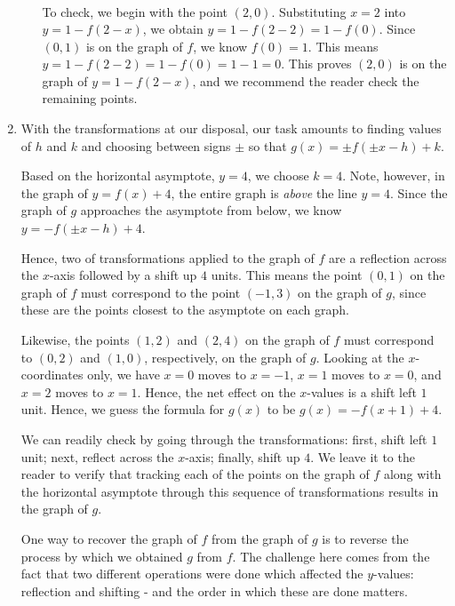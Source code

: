 \documentclass{ximera}
\begin{document}
\begin{example}
\begin{enumerate}
\begin{enumerate}
\[\begin{array}{ccc}
\end{array}\]

To check, we begin with the point $(2,0)$.  Substituting $x=2$ into $y=1 - f(2-x)$, we obtain $y = 1-f(2-2) = 1-f(0)$.  Since $(0,1)$ is on the graph of $f$, we know $f(0) = 1$.  This means $y = 1-f(2-2) = 1-f(0)= 1-1 = 0$.  This proves $(2,0)$ is on the graph of  $y=1 - f(2-x)$, and we recommend the reader check the remaining points.
 
 \end{enumerate}

 \item With the transformations at our disposal,  our task amounts to finding values of $h$ and $k$ and choosing between signs $\pm$  so that  $g(x) = \pm f( \pm x - h) + k$.  
 
 \smallskip
 
 Based on the horizontal asymptote, $y=4$, we choose $k=4$.  Note, however, in the graph of $y=f(x)+4$, the entire graph is \textit{above} the line $y=4$.  Since the graph of $g$ approaches the asymptote from below, we know  $y=-f(\pm x-h)+4$.  
 
 \smallskip
 
 Hence, two of transformations applied to the graph of $f$ are a reflection across the $x$-axis followed by a shift up $4$ units.  This means the point $(0,1)$ on the graph of $f$ must correspond to the point $(-1,3)$ on the graph of $g$, since these are the points closest to the asymptote on each graph.  
  
  \smallskip
  
Likewise, the points $(1,2)$ and $(2,4)$ on the graph of $f$ must correspond to $(0,2)$ and $(1,0)$, respectively, on the graph of $g$.  Looking at the $x$-coordinates only, we have $x=0$ moves to $x=-1$, $x=1$ moves to $x=0$, and $x=2$ moves to $x=1$.  Hence, the net effect on the $x$-values is a shift left $1$ unit.  Hence, we guess the formula for $g(x)$ to be $g(x) = -f(x+1)+4$.  

\smallskip

We can readily check by going through the transformations:  first, shift left $1$ unit; next,  reflect across the $x$-axis;  finally, shift up $4$.  We leave it to the reader to verify that tracking each of the points on the graph of $f$ along with the horizontal asymptote through this sequence of transformations results in the graph of $g$.  
 
 
 \smallskip
 
 
 One way to recover the graph of $f$ from the graph of $g$ is to reverse the process by which we obtained $g$ from $f$.  The challenge here comes from the fact that two different operations were done which affected the $y$-values:  reflection and shifting - and the order in which these are done matters.  
 

\end{enumerate}
\end{example}
\end{document}

